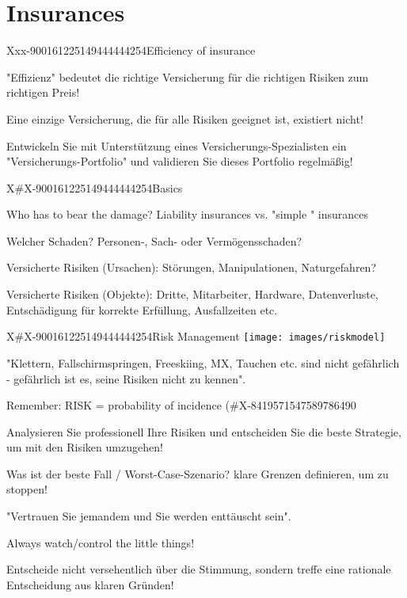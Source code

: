\section{Insurances}
Xxx-900161225149444444254{Efficiency of insurance}
\begin{compactitem}
	\item "Effizienz" bedeutet die richtige Versicherung für die richtigen Risiken zum richtigen Preis!
	\item Eine einzige Versicherung, die für alle Risiken geeignet ist, existiert nicht!
	\item Entwickeln Sie mit Unterstützung eines Versicherungs-Spezialisten ein "Versicherungs-Portfolio" und validieren Sie dieses Portfolio regelmäßig!
\end{compactitem}

X#X-900161225149444444254{Basics}
\begin{compactitem}
	\item Who has to bear the damage? Liability insurances vs. "simple "	insurances
	\item Welcher Schaden? Personen-, Sach- oder Vermögensschaden?
	\item Versicherte Risiken (Ursachen): Störungen, Manipulationen, Naturgefahren?
	\item Versicherte Risiken (Objekte): Dritte, Mitarbeiter, Hardware, Datenverluste, Entschädigung für korrekte Erfüllung, Ausfallzeiten etc.
\end{compactitem}

X#X-900161225149444444254{Risk Management}
\texttt{[image: images/riskmodel]}
\begin{compactitem}
	\item "Klettern, Fallschirmspringen, Freeskiing, MX, Tauchen etc. sind nicht gefährlich - gefährlich ist es, seine Risiken nicht zu kennen".
	\item Remember: RISK = probability of incidence (\X#X-8419571547589786490
	\item Analysieren Sie professionell Ihre Risiken und entscheiden Sie die beste Strategie, um mit den Risiken umzugehen!
	\item Was ist der beste Fall / Worst-Case-Szenario? klare Grenzen definieren, um zu stoppen!
	\item "Vertrauen Sie jemandem und Sie werden enttäuscht sein".
	\item Always watch/control the little things!
	\item Entscheide nicht versehentlich über die Stimmung, sondern treffe eine rationale Entscheidung aus klaren Gründen!
\end{compactitem}

